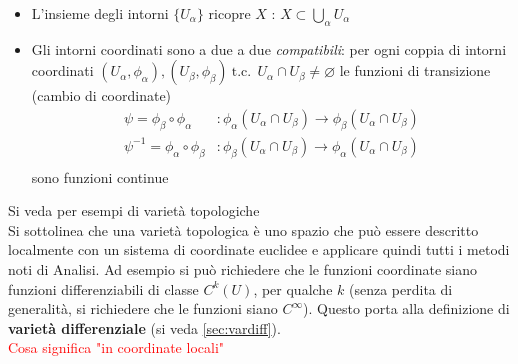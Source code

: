 \begin{itemize}
    \item L'insieme degli intorni $\{U_\alpha\}$ ricopre $X$ :
        $X \subset \bigcup \limits_\alpha U_\alpha$
    \item Gli intorni coordinati sono a due a due \emph{compatibili}: per ogni coppia
    di intorni coordinati
       $(U_\alpha , \phi_\alpha), (U_\beta , \phi_\beta) \mathrm{\:t.c.\:} \:
       U_\alpha \cap U_\beta \neq \varnothing $
    le funzioni di transizione (cambio di coordinate)
    \begin{equation*}
        \begin{split}
           \psi = \phi_\beta \circ \phi_\alpha &: \phi_\alpha(U_\alpha \cap U_\beta)
              \to \phi_\beta (U_\alpha \cap U_\beta) \\
           \psi^{-1} = \phi_\alpha \circ \phi_\beta &: \phi_\beta(U_\alpha \cap U_\beta)
              \to \phi_\alpha (U_\alpha \cap U_\beta) \\
        \end{split}
    \end{equation*}
    sono funzioni continue
\end{itemize}
Si veda \cite{sernesi} per esempi di varietà topologiche\\

Si sottolinea che una varietà topologica è uno spazio che può essere descritto
localmente con un sistema di coordinate euclidee e applicare quindi tutti i metodi
noti di Analisi.
Ad esempio si può richiedere che le funzioni coordinate siano funzioni differenziabili
di classe $C^{k}(U)$, per qualche $k$ (senza perdita di generalità, si richiedere che le funzioni siano $C^\infty$). Questo porta alla definizione di
\textbf{varietà differenziale} (si veda \ref{sec:vardiff}).\\
\textcolor{red}{Cosa significa "in coordinate locali"}
